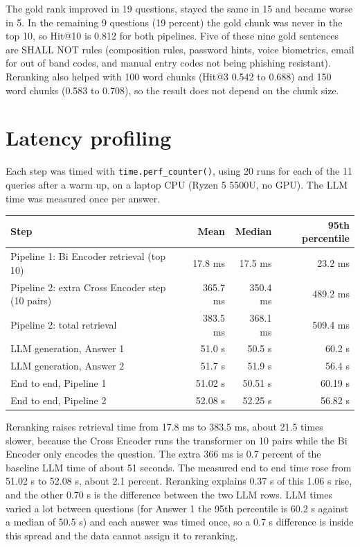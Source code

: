 \documentclass[11pt,a4paper]{article}
\begin{document}
The gold rank improved in 19 questions, stayed the same in 15 and became worse in 5. In the remaining 9 questions (19 percent) the gold chunk was never in the top 10, so Hit@10 is 0.812 for both pipelines. Five of these nine gold sentences are SHALL NOT rules (composition rules, password hints, voice biometrics, email for out of band codes, and manual entry codes not being phishing resistant). Reranking also helped with 100 word chunks (Hit@3 0.542 to 0.688) and 150 word chunks (0.583 to 0.708), so the result does not depend on the chunk size.

\section{Latency profiling}

Each step was timed with \texttt{time.perf\_counter()}, using 20 runs for each of the 11 queries after a warm up, on a laptop CPU (Ryzen 5 5500U, no GPU). The LLM time was measured once per answer.

\begin{center}
\small
\begin{tabular}{@{}lrrr@{}}
\toprule
Step & Mean & Median & 95th percentile \\
\midrule
Pipeline 1: Bi Encoder retrieval (top 10) & 17.8 ms & 17.5 ms & 23.2 ms \\
Pipeline 2: extra Cross Encoder step (10 pairs) & 365.7 ms & 350.4 ms & 489.2 ms \\
Pipeline 2: total retrieval & 383.5 ms & 368.1 ms & 509.4 ms \\
LLM generation, Answer 1 & 51.0 s & 50.5 s & 60.2 s \\
LLM generation, Answer 2 & 51.7 s & 51.9 s & 56.4 s \\
End to end, Pipeline 1 & 51.02 s & 50.51 s & 60.19 s \\
End to end, Pipeline 2 & 52.08 s & 52.25 s & 56.82 s \\
\bottomrule
\end{tabular}
\end{center}

Reranking raises retrieval time from 17.8 ms to 383.5 ms, about 21.5 times slower, because the Cross Encoder runs the transformer on 10 pairs while the Bi Encoder only encodes the question. The extra 366 ms is 0.7 percent of the baseline LLM time of about 51 seconds. The measured end to end time rose from 51.02 s to 52.08 s, about 2.1 percent. Reranking explains 0.37 s of this 1.06 s rise, and the other 0.70 s is the difference between the two LLM rows. LLM times varied a lot between questions (for Answer 1 the 95th percentile is 60.2 s against a median of 50.5 s) and each answer was timed once, so a 0.7 s difference is inside this spread and the data cannot assign it to reranking.
\end{document}
